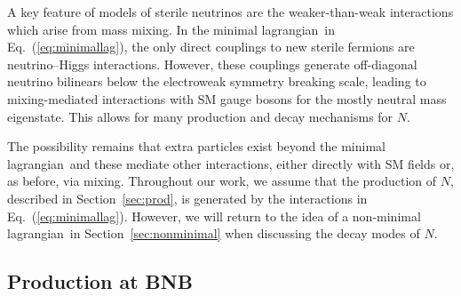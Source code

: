 \documentclass[11pt, a4paper]{article}
\newcommand{\refeq}[1]{Eq.~(\ref{#1})}
\newcommand{\refsec}[1]{Section~\ref{#1}}
\def\lagrangian{lagrangian}
\begin{document}
A key feature of models of sterile neutrinos are the weaker-than-weak
interactions which arise from mass mixing. In the minimal \lagrangian\ in
\refeq{eq:minimallag}, the only direct couplings to new sterile fermions are
neutrino--Higgs interactions. However, these couplings generate off-diagonal
neutrino bilinears below the electroweak symmetry breaking scale, leading to
mixing-mediated interactions with SM gauge bosons for the mostly neutral mass
eigenstate. This allows for many production and decay mechanisms for $N$. 

The possibility remains that extra particles exist beyond the minimal
\lagrangian\ and these mediate other interactions, either directly with SM
fields or, as before, via mixing. 
%
Throughout our work, we assume that the production of $N$, described in
\refsec{sec:prod}, is generated by the interactions in \refeq{eq:minimallag}.
However, we will return to the idea of a non-minimal \lagrangian\ in
\refsec{sec:nonminimal} when discussing the decay modes of $N$.

\subsection{\label{sec:prod}Production at BNB}
\end{document}
